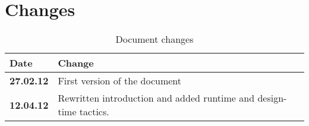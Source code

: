 \pagebreak

\section{Changes}

\begin{table}[h!]
\begin{tabular}{ | p{90pt} | p{270pt}  |}
\hline
\bf Date & \bf Change \\ \hline
\bf 27.02.12  &  First version of the document  \\ \hline
\bf 12.04.12  &  Rewritten introduction and added runtime and design-time tactics.  \\ \hline
\end{tabular}
\caption{Document changes}
\end{table}





